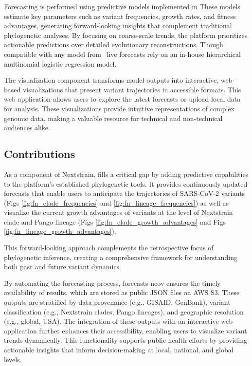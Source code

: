 Forecasting is performed using predictive models implemented in \evofr\.
These models estimate key parameters such as variant frequencies, growth rates, and fitness advantages, generating forward-looking insights that complement traditional phylogenetic analyses.
By focusing on coarse-scale trends, the platform prioritizes actionable predictions over detailed evolutionary reconstructions.
Though compatible with any model from \evofr\, live forecasts rely on an in-house hierarchical multinomial logistic regression model.

The visualization component transforms model outputs into interactive, web-based visualizations that present variant trajectories in accessible formats.
This web application allows users to explore the latest forecasts or upload local data for analysis.
These visualizations provide intuitive representations of complex genomic data, making \forecastsNcov a valuable resource for technical and non-technical audiences alike.

\subsection{Contributions}

As a component of Nextstrain, \forecastsNcov fills a critical gap by adding predictive capabilities to the platform’s established phylogenetic tools.
It provides continuously updated forecasts that enable users to anticipate the trajectories of SARS-CoV-2 variants (Figs \ref{fig:fn_clade_frequencies} and \ref{fig:fn_lineage_frequencies})  as well as visualize the current growth advantages of variants at the level of Nextstrain clade and Pango lineage (Figs \ref{fig:fn_clade_growth_advantages} and Figs \ref{fig:fn_lineage_growth_advantages}).


This forward-looking approach complements the retrospective focus of phylogenetic inference, creating a comprehensive framework for understanding both past and future variant dynamics.

By automating the forecasting process, forecasts-ncov ensures the timely availability of results, which are stored as public JSON files on AWS S3.
These outputs are stratified by data provenance (e.g., GISAID, GenBank), variant classification (e.g., Nextstrain clades, Pango lineages), and geographic resolution (e.g., global, USA).
The integration of these outputs with an interactive web application further enhances their accessibility, enabling users to visualize variant trends dynamically.
This functionality supports public health efforts by providing actionable insights that inform decision-making at local, national, and global levels.

